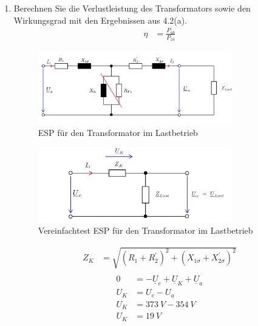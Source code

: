 \begin{enumerate}[label=\alph*)]
	\item Berechnen Sie die Verlustleistung des Transformators sowie den Wirkungsgrad mit
	      den Ergebnissen aus 4.2(a).
	      \begin{align*}
		      \eta & = \frac{P_{ab}}{P_{zu}}
	      \end{align*}

	      \begin{figure}[h!]
		      \begin{center}
			      \includegraphics[width=0.8\textwidth]{img/4.2.2.1}
		      \end{center}
		      \caption{ESP für den Transformator im Lastbetrieb}\label{img:4.2.2.1}
	      \end{figure}

	      \begin{figure}[h!]
		      \begin{center}
			      \includegraphics[width=0.8\textwidth]{img/4.2.2.2}
		      \end{center}
		      \caption{Vereinfachtest ESP für den Transformator im Lastbetrieb}\label{img:4.2.2.2}
	      \end{figure}
	      \begin{align*}
		      Z_{K} & = \sqrt{(R_{1}+R^{'}_{2})^2+(X_{1\sigma}+X^{'}_{2\sigma})^2} \\
	      \end{align*}
	      \begin{align*}
		      0     & = -\underline{U}_{e}+\underline{U}_{K}+\underline{U}_{a} \\
		      U_{K} & = U_{e}-U_{a}                                            \\
		      U_{K} & = 373\ V - 354\ V                                        \\
		      U_{K} & = 19\ V
	      \end{align*}


\end{enumerate}
